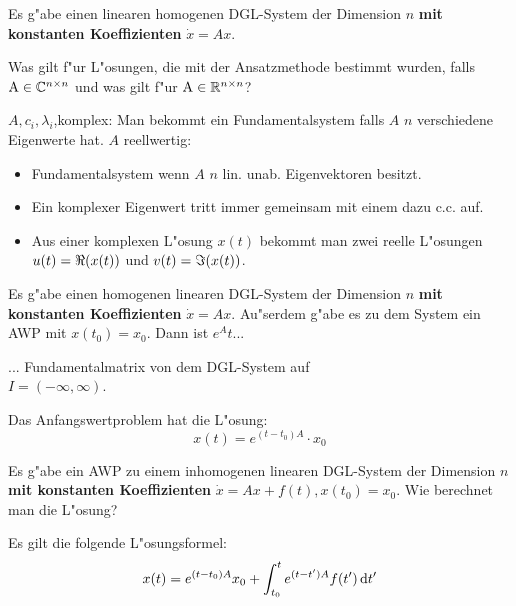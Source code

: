 \documentclass[9pt]{article}
\newcommand{\R}[1]{%
	\ifthenelse{\equal{#1}{}}
	{\mathbb{R}}
	{\mathbb{R}^{#1}}}%
\newcommand{\C}[1]{%
	\ifthenelse{\equal{#1}{}}
	{\mathbb{C}}
	{\mathbb{C}^{#1}}}%
\newenvironment{field}{}{\newpage}
\newif\ifnote
\newenvironment{note}{\notetrue}{\notefalse}
\newcommand{\localtag}{}
\newcommand{\globaltag}{}
\newcommand{\uuid}{}
\newcommand{\tags}[1]{
    \ifnote 
        \renewcommand{\localtag}{#1}
    \else
        \renewcommand{\globaltag}{#1}
    \fi 
    }
\newcommand{\xplain}[1]{\renewcommand{\uuid}{#1}}
\begin{document}
		\begin{note}
			\xplain{201048f4-7644-42c5-b811-2c31c2b80d0f}
			\tags{LDGLS, konstante-koeffizienten, 3.9}
			
			\begin{field}  %
				Es g"abe einen linearen homogenen  DGL-System der Dimension $n$
				\textbf{mit konstanten Koeffizienten}
				$\dot{x} = Ax$.

				 Was gilt f"ur L"osungen, die mit der Ansatzmethode bestimmt wurden, falls $\A \in \C{n\times n}$ und was gilt f"ur  $\A \in \R{n\times n}$?
			\end{field}
			
			\begin{field}  %
				$A,c_i, \lambda_i$,komplex: Man bekommt ein Fundamentalsystem falls $A$ $n$ verschiedene Eigenwerte hat.
				$A$ reellwertig:
				\begin{itemize}
					\item Fundamentalsystem wenn $A$ $n$ lin. unab. Eigenvektoren besitzt. 
					\item Ein komplexer Eigenwert tritt immer gemeinsam mit einem dazu c.c. auf.
					\item Aus einer komplexen L"osung $x(t)$ bekommt man zwei reelle L"osungen $u(t)= \real (x(t))$ und $v(t)=\imaginary (x(t))$.
				\end{itemize} 
			\end{field}
		\end{note}
		\begin{note}
			\xplain{3bb07f22-0aed-4f81-bed3-4c36b307b1e2}
			\tags{LDGLS, konstante-koeffizienten, 3.9}
			
			\begin{field}  %
				Es g"abe einen homogenen linearen DGL-System der Dimension $n$
				\textbf{mit konstanten Koeffizienten}
				$\dot{x} = Ax$. Au"serdem g"abe es zu dem System ein AWP mit $x(t_0)=x_0$.
				Dann ist $e^At$...
			\end{field}
			
			\begin{field}  %
				... Fundamentalmatrix von dem DGL-System auf \\ ${I=(-\infty, \infty)}$.
				
				Das Anfangswertproblem hat die L"osung:
				\begin{equation*}
					x(t) = e^{(t-t_0) A} \cdot x_0
				\end{equation*}  
			\end{field}
				
			\begin{field}  %
				Es g"abe ein AWP zu einem inhomogenen linearen DGL-System der Dimension $n$
				\textbf{mit konstanten Koeffizienten}
				$\dot{x} = Ax+ f(t), x(t_0)=x_0$.
				Wie berechnet man die L"osung?
			\end{field}
			
			\begin{field}  %
				Es gilt die folgende L"osungsformel:
				\begin{equation}
					x(t) = e^{(t-t_0)A} x_0 + \int_{t_0}^{t}
					e^{(t-t')A}f(t')\dif t'
				\end{equation}
			\end{field}
		\end{note}
\end{document}
